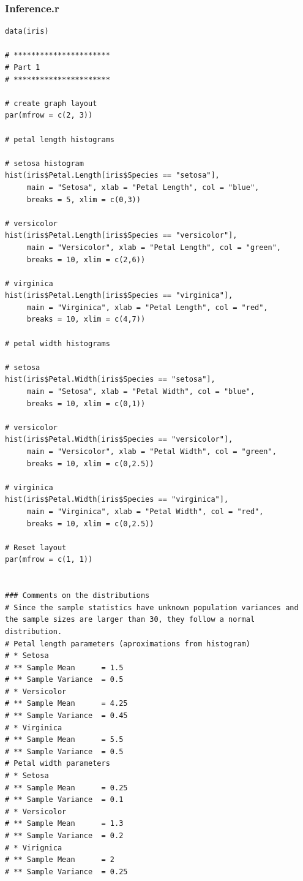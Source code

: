 \documentclass{article}
\begin{document}
\subsubsection{Inference.r}
\begin{lstlisting}[style=R]
data(iris)

# **********************
# Part 1
# **********************

# create graph layout
par(mfrow = c(2, 3))

# petal length histograms

# setosa histogram
hist(iris$Petal.Length[iris$Species == "setosa"],
     main = "Setosa", xlab = "Petal Length", col = "blue",
     breaks = 5, xlim = c(0,3))

# versicolor
hist(iris$Petal.Length[iris$Species == "versicolor"],
     main = "Versicolor", xlab = "Petal Length", col = "green",
     breaks = 10, xlim = c(2,6))

# virginica
hist(iris$Petal.Length[iris$Species == "virginica"],
     main = "Virginica", xlab = "Petal Length", col = "red",
     breaks = 10, xlim = c(4,7))

# petal width histograms

# setosa
hist(iris$Petal.Width[iris$Species == "setosa"],
     main = "Setosa", xlab = "Petal Width", col = "blue",
     breaks = 10, xlim = c(0,1))

# versicolor
hist(iris$Petal.Width[iris$Species == "versicolor"],
     main = "Versicolor", xlab = "Petal Width", col = "green",
     breaks = 10, xlim = c(0,2.5))

# virginica
hist(iris$Petal.Width[iris$Species == "virginica"],
     main = "Virginica", xlab = "Petal Width", col = "red",
     breaks = 10, xlim = c(0,2.5))

# Reset layout
par(mfrow = c(1, 1))


### Comments on the distributions
# Since the sample statistics have unknown population variances and the sample sizes are larger than 30, they follow a normal distribution. 
# Petal length parameters (aproximations from histogram)
# * Setosa
# ** Sample Mean      = 1.5
# ** Sample Variance  = 0.5
# * Versicolor
# ** Sample Mean      = 4.25
# ** Sample Variance  = 0.45
# * Virginica
# ** Sample Mean      = 5.5
# ** Sample Variance  = 0.5
# Petal width parameters
# * Setosa
# ** Sample Mean      = 0.25
# ** Sample Variance  = 0.1
# * Versicolor
# ** Sample Mean      = 1.3
# ** Sample Variance  = 0.2
# * Virignica
# ** Sample Mean      = 2
# ** Sample Variance  = 0.25



\end{lstlisting}
\end{document}
